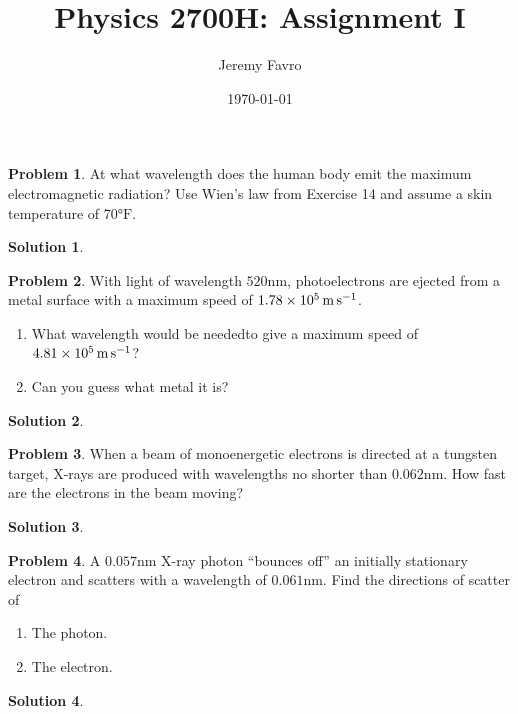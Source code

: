 \documentclass[10pt]{article}
\title{Physics 2700H: Assignment I}
\author{Jeremy Favro}
\date{\today}
\theoremstyle{definition}
\newtheorem{problem}{Problem}
\newtheorem{soln}{Solution}
\begin{document}
\maketitle

\begin{problem}
At what wavelength does the human body emit the maximum electromagnetic radiation? Use Wien's law from Exercise 14 and assume a skin
temperature of 70$\unit{\degree}\mathrm{F}$.
\end{problem}
\begin{soln}
\end{soln}

\begin{problem}
With light of wavelength $520\unit{\nano\meter}$, photoelectrons are ejected from a metal surface with a maximum speed of $\SI{1.78d5}{\meter\per\second}$.
\begin{enumerate}[label=(\alph*)]
  \item What wavelength would be neededto give a maximum speed of $\SI{4.81d5}{\meter\per\second}$?
  \item Can you guess what metal it is?
\end{enumerate}
\end{problem}
\begin{soln}
\end{soln}

\begin{problem}
When a beam of monoenergetic electrons is directed at a tungsten target, X-rays are produced with wavelengths no shorter than
$0.062\unit{\nano\meter}$. How fast are the electrons in the beam moving?
\end{problem}
\begin{soln}
\end{soln}

\begin{problem}
A $0.057\unit{\nano\meter}$ X-ray photon ``bounces off'' an initially stationary electron and scatters with a wavelength of $0.061\unit{\nano\meter}$. Find the directions of scatter of
\begin{enumerate}[label=(\alph*)]
  \item The photon.
  \item The electron.
\end{enumerate}
\end{problem}
\begin{soln}
\end{soln}
\end{document}

